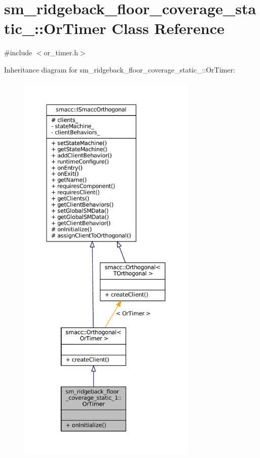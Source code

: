 \hypertarget{classsm__ridgeback__floor__coverage__static__1_1_1OrTimer}{}\section{sm\+\_\+ridgeback\+\_\+floor\+\_\+coverage\+\_\+static\+\_\+:\+:Or\+Timer Class Reference}
\label{classsm__ridgeback__floor__coverage__static__1_1_1OrTimer}


{\ttfamily \#include $<$or\+\_\+timer.\+h$>$}



Inheritance diagram for sm\+\_\+ridgeback\+\_\+floor\+\_\+coverage\+\_\+static\+\_\+:\+:Or\+Timer\+:
\nopagebreak
\begin{figure}[H]
\begin{center}
\leavevmode
\includegraphics[height=550pt]{classsm__ridgeback__floor__coverage__static__1_1_1OrTimer__inherit__graph}
\end{center}
\end{figure}


